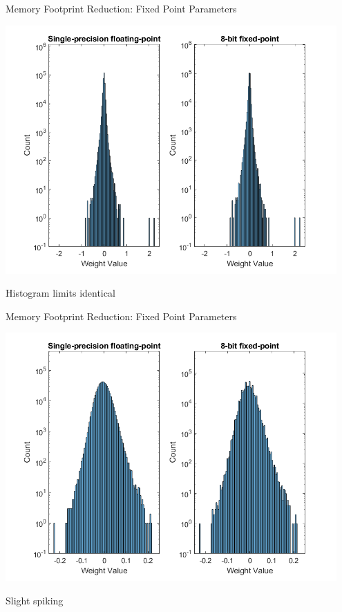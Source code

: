 \begin{frame}{Memory Footprint Reduction: Fixed Point Parameters}
	\begin{minipage}{0.6\textwidth}
		\centering
		\includegraphics[width=0.95\textwidth]{../Images/Weights-distributions/original-vs-fixed8/weight-distribution-conv2-MQE.png}\\
	\end{minipage}%
	\begin{minipage}{0.4\textwidth}
		\large Histogram limits identical\\
	\end{minipage}
\end{frame}

\begin{frame}{Memory Footprint Reduction: Fixed Point Parameters}
	\begin{minipage}{0.6\textwidth}
		\centering
		\includegraphics[width=0.95\textwidth]{../Images/Weights-distributions/original-vs-fixed8/weight-distribution-conv5-MQE.png}\\
	\end{minipage}%
	\begin{minipage}{0.4\textwidth}
		\large Slight spiking\\
	\end{minipage}
\end{frame}

